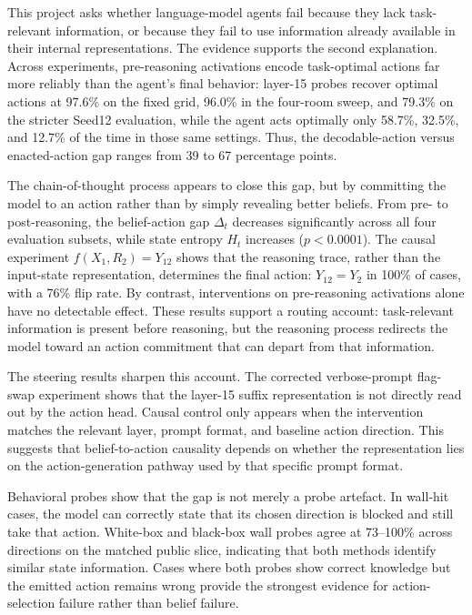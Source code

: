 \documentclass[final]{sparreport}
\begin{document}
This project asks whether language-model agents fail because they lack task-relevant information, or because they fail to use information already available in their internal representations. The evidence supports the second explanation. Across experiments, pre-reasoning activations encode task-optimal actions far more reliably than the agent’s final behavior: layer-15 probes recover optimal actions at 97.6\% on the fixed grid, 96.0\% in the four-room sweep, and 79.3\% on the stricter Seed12 evaluation, while the agent acts optimally only 58.7\%, 32.5\%, and 12.7\% of the time in those same settings. Thus, the decodable-action versus enacted-action gap ranges from 39 to 67 percentage points.

The chain-of-thought process appears to close this gap, but by committing the model to an action rather than by simply revealing better beliefs. From pre- to post-reasoning, the belief-action gap $\Delta_t$ decreases significantly across all four evaluation subsets, while state entropy $H_t$ increases ($p < 0.0001$). The causal experiment $f(X_1, R_2)=Y_{12}$ shows that the reasoning trace, rather than the input-state representation, determines the final action: $Y_{12}=Y_2$ in 100\% of cases, with a 76\% flip rate. By contrast, interventions on pre-reasoning activations alone have no detectable effect. These results support a routing account: task-relevant information is present before reasoning, but the reasoning process redirects the model toward an action commitment that can depart from that information.

The steering results sharpen this account. The corrected verbose-prompt flag-swap experiment shows that the layer-15 suffix representation is not directly read out by the action head. Causal control only appears when the intervention matches the relevant layer, prompt format, and baseline action direction. This suggests that belief-to-action causality depends on whether the representation lies on the action-generation pathway used by that specific prompt format.

Behavioral probes show that the gap is not merely a probe artefact. In wall-hit cases, the model can correctly state that its chosen direction is blocked and still take that action. White-box and black-box wall probes agree at 73--100\% across directions on the matched public slice, indicating that both methods identify similar state information. Cases where both probes show correct knowledge but the emitted action remains wrong provide the strongest evidence for action-selection failure rather than belief failure.
\end{document}
